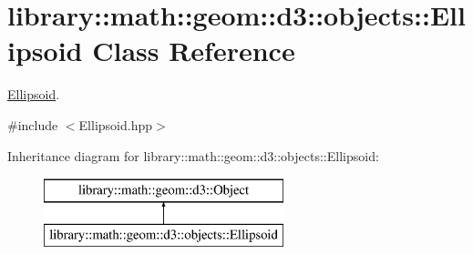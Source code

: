 \hypertarget{classlibrary_1_1math_1_1geom_1_1d3_1_1objects_1_1_ellipsoid}{}\section{library\+:\+:math\+:\+:geom\+:\+:d3\+:\+:objects\+:\+:Ellipsoid Class Reference}
\label{classlibrary_1_1math_1_1geom_1_1d3_1_1objects_1_1_ellipsoid}


\hyperlink{classlibrary_1_1math_1_1geom_1_1d3_1_1objects_1_1_ellipsoid}{Ellipsoid}.  




{\ttfamily \#include $<$Ellipsoid.\+hpp$>$}

Inheritance diagram for library\+:\+:math\+:\+:geom\+:\+:d3\+:\+:objects\+:\+:Ellipsoid\+:\begin{figure}[H]
\begin{center}
\leavevmode
\includegraphics[height=2.000000cm]{classlibrary_1_1math_1_1geom_1_1d3_1_1objects_1_1_ellipsoid}
\end{center}
\end{figure}
